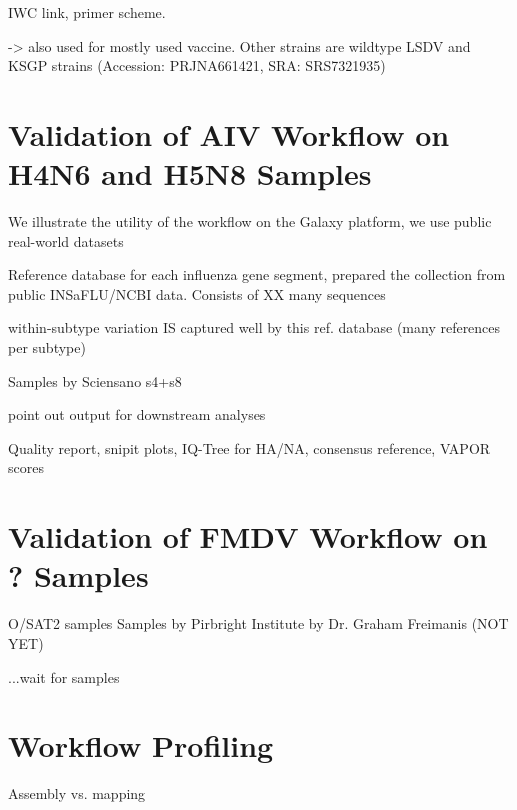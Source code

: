 \todoit
\ac{IWC} link, primer scheme.

-> also used for mostly used vaccine. Other strains are wildtype LSDV and KSGP strains (Accession: PRJNA661421, SRA: SRS7321935)


\section{Validation of AIV Workflow on H4N6 and H5N8 Samples}\label{sec:4-aiv}
\todoit

We illustrate the utility of the workflow on the Galaxy platform, we use public real-world datasets

Reference database for each influenza gene segment, prepared the collection from public INSaFLU/NCBI data. Consists of XX many sequences

within-subtype variation IS captured well by this ref. database (many references per subtype)


Samples by Sciensano s4+s8

point out output for downstream analyses 

Quality report, snipit plots, IQ-Tree for \ac{HA}/\ac{NA}, consensus reference, VAPOR scores

\section{Validation of FMDV Workflow on ? Samples}
O/SAT2 samples
\todoit
Samples by Pirbright Institute by Dr. Graham Freimanis (NOT YET)

...wait for samples

\section{Workflow Profiling}
\todoit
Assembly vs. mapping
 